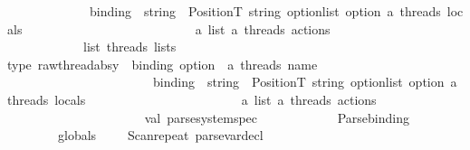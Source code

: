 \begin{isabellebody}
\ \ \ \ \ \ \ \ \ \ \ \ \ {\isacharparenleft}{\kern0pt}{\isacharparenleft}{\kern0pt}binding\ {\isacharasterisk}{\kern0pt}\ {\isacharparenleft}{\kern0pt}string\ {\isacharasterisk}{\kern0pt}\ Position{\isachardot}{\kern0pt}T{\isacharparenright}{\kern0pt}{\isacharparenright}{\kern0pt}\ {\isacharasterisk}{\kern0pt}string\ option{\isacharparenright}{\kern0pt}list\ option{\isacharparenright}{\kern0pt}\ {\isacharparenleft}{\kern0pt}{\isacharasterisk}{\kern0pt}a\ thread{\isacharprime}{\kern0pt}s\ locals{\isacharasterisk}{\kern0pt}{\isacharparenright}{\kern0pt}\isanewline
\ \ \ \ \ \ \ \ \ \ \ \ {\isacharasterisk}{\kern0pt}\isanewline
\ \ \ \ \ \ \ \ \ \ \ \ \ \ a\ list\ {\isacharparenleft}{\kern0pt}{\isacharasterisk}{\kern0pt}a\ thread{\isacharprime}{\kern0pt}s\ actions{\isacharasterisk}{\kern0pt}{\isacharparenright}{\kern0pt}\isanewline
\ \ \ \ \ \ \ \ \ \ \ {\isacharparenright}{\kern0pt}\ list{\isacharparenright}{\kern0pt}\ {\isacharparenleft}{\kern0pt}{\isacharasterisk}{\kern0pt}threads\ lists{\isacharasterisk}{\kern0pt}{\isacharparenright}{\kern0pt}\isanewline
\isanewline
type\ raw{\isacharunderscore}{\kern0pt}thread{\isacharunderscore}{\kern0pt}absy\ {\isacharequal}{\kern0pt}\ {\isacharparenleft}{\kern0pt}binding\ option\ {\isacharasterisk}{\kern0pt}\ {\isacharparenleft}{\kern0pt}{\isacharasterisk}{\kern0pt}a\ thread{\isacharprime}{\kern0pt}s\ name{\isacharasterisk}{\kern0pt}{\isacharparenright}{\kern0pt}\isanewline
\ \ \ \ \ \ \ \ \ \ \ \ \ \ \ \ \ \ \ \ \ \ \ {\isacharparenleft}{\kern0pt}{\isacharparenleft}{\kern0pt}binding\ {\isacharasterisk}{\kern0pt}\ {\isacharparenleft}{\kern0pt}string\ {\isacharasterisk}{\kern0pt}\ Position{\isachardot}{\kern0pt}T{\isacharparenright}{\kern0pt}{\isacharparenright}{\kern0pt}\ {\isacharasterisk}{\kern0pt}string\ option{\isacharparenright}{\kern0pt}list\ option{\isacharparenright}{\kern0pt}{\isacharasterisk}{\kern0pt}\ {\isacharparenleft}{\kern0pt}{\isacharasterisk}{\kern0pt}a\ thread{\isacharprime}{\kern0pt}s\ locals{\isacharasterisk}{\kern0pt}{\isacharparenright}{\kern0pt}\isanewline
\ \ \ \ \ \ \ \ \ \ \ \ \ \ \ \ \ \ \ \ \ \ \ \ a\ list\ {\isacharparenleft}{\kern0pt}{\isacharasterisk}{\kern0pt}a\ thread{\isacharprime}{\kern0pt}s\ actions{\isacharasterisk}{\kern0pt}{\isacharparenright}{\kern0pt}\isanewline
\ \ \ \ \ \ \ \ \ \ \ \ \ \ \ \ \ \ \ \ \ \isanewline
\isanewline
val\ parse{\isacharunderscore}{\kern0pt}system{\isacharunderscore}{\kern0pt}spec\ {\isacharequal}{\kern0pt}\ {\isacharparenleft}{\kern0pt}\isanewline
\ \ \ \ \ \ \ \ \ \ Parse{\isachardot}{\kern0pt}binding\ \isanewline
\ \ \ \ \ \ \ {\isacharminus}{\kern0pt}{\isacharminus}{\kern0pt}{\isacharbar}{\kern0pt}\ \isactrlkeyword {\isasymopen}globals{\isasymclose}\ \ \ \ {\isacharminus}{\kern0pt}{\isacharminus}{\kern0pt}\ {\isacharparenleft}{\kern0pt}Scan{\isachardot}{\kern0pt}repeat\ parse{\isacharunderscore}{\kern0pt}var{\isacharunderscore}{\kern0pt}decl{\isacharparenright}{\kern0pt}\isanewline

\end{isabellebody}
